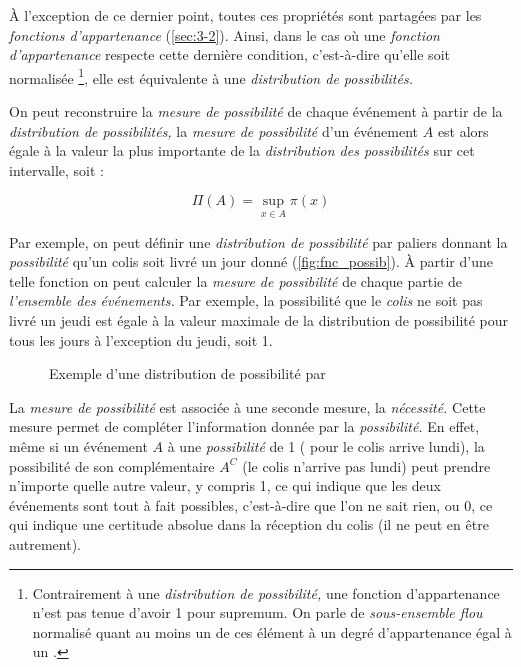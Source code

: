 À l'exception de ce dernier point, toutes ces propriétés sont
partagées par les \emph{fonctions d'appartenance}
(\autoref{sec:3-2}). Ainsi, dans le cas où une \emph{fonction
  d'appartenance} respecte cette dernière condition, c'est-à-dire
qu'elle soit normalisée \footnote{Contrairement à une
  \emph{distribution de possibilité,} une fonction d'appartenance
  n'est pas tenue d'avoir 1 pour supremum. On parle de
  \emph{sous-ensemble flou} normalisé quant au moins un de ces élément
  à un degré d’appartenance égal à un
  \autocite{Bouchon-Meunier2007}.}, elle est équivalente à une
\emph{distribution de possibilités.}

On peut reconstruire la \emph{mesure de possibilité} de chaque
événement à partir de la \emph{distribution de possibilités,} la
\emph{mesure de possibilité} d'un événement \(A\) est alors égale à la
valeur la plus importante de la \emph{distribution des possibilités}
sur cet intervalle, soit :

\begin{equation}
  \Pi(A) = \sup_{x \in A}\pi(x)
\end{equation}

Par exemple, on peut définir une \emph{distribution de possibilité}
par paliers donnant la \emph{possibilité} qu'un colis soit livré un
jour donné (\autoref{fig:fnc_possib}). À partir d'une telle fonction
on peut calculer la \emph{mesure de possibilité} de chaque partie de
\emph{l'ensemble des événements.} Par exemple, la possibilité que le
\emph{colis} ne soit pas livré un jeudi est égale à la valeur maximale
de la distribution de possibilité pour tous les jours à l'exception du
jeudi, soit 1.

\begin{figure}[hb]
  \centering
  
  \caption{Exemple d'une distribution de possibilité par }
  \label{fig:fnc_possib}
\end{figure}

La \emph{mesure de possibilité} est associée à une seconde mesure, la
\emph{nécessité.} Cette mesure permet de compléter l'information
donnée par la \emph{possibilité.} En effet, même si un événement \(A\)
à une \emph{possibilité} de 1 ( pour le colis arrive lundi), la
possibilité de son complémentaire \(A^C\) (\ie le colis n'arrive pas
lundi) peut prendre n'importe quelle autre valeur, y compris 1, ce qui
indique que les deux événements sont tout à fait possibles,
c'est-à-dire que l'on ne sait rien, ou 0, ce qui indique une certitude
absolue dans la réception du colis (\ie il ne peut en être autrement).

